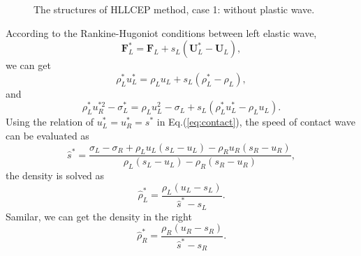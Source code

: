 \documentclass{article}
\numberwithin{equation}{section}
\numberwithin{table}{section}
\begin{document}
\begin{figure}
  \centering
\caption{The  structures of HLLCEP method, case 1: without plastic wave.}
\label{fig:case1}
\end{figure}
According to the Rankine-Hugoniot conditions between left elastic wave,
\begin{equation} \label{eq:RH1}
	\bm{F}_L^* = \bm{F}_L+s_L (\bm{U}_L^*-\bm{U}_L),
\end{equation}
we can  get
\begin{equation} \label{eq:rhoLstar}
  \rho_L^* u_L^*=\rho_L u_L+s_L(\rho_L^*-\rho_L),
\end{equation}
and
\begin{equation}\label{eq:sigma}
  \rho_L^* u_R^{*2}-\sigma^*_L=\rho_L u_L^2-\sigma_L+s_L(\rho_L^* u_L^*-\rho_L u_L).
\end{equation}
Using the relation of $u_L^* =u_R^* = s^*$ in Eq.(\ref{eq:contact}), the speed of contact wave can be evaluated as
\begin{equation}
 \hat{s}^* = \frac{\sigma_L-\sigma_R+\rho_L u_L(s_L-u_L)-\rho_R u_R(s_R-u_R)}{\rho_L(s_L-u_L)-\rho_R(s_R-u_R)},
\end{equation}
the density is solved as
\begin{equation}\label{eq:rhoLs}
  \hat{\rho}_L^* = \frac{\rho_L(u_L-s_L)}{\hat{s}^*-s_L}.
\end{equation}
Samilar, we can get the density in the right
\begin{equation}\label{eq:rhoLs}
  \hat{\rho}_R^* = \frac{\rho_R(u_R-s_R)}{\hat{s}^*-s_R}.
\end{equation}
\end{document}

